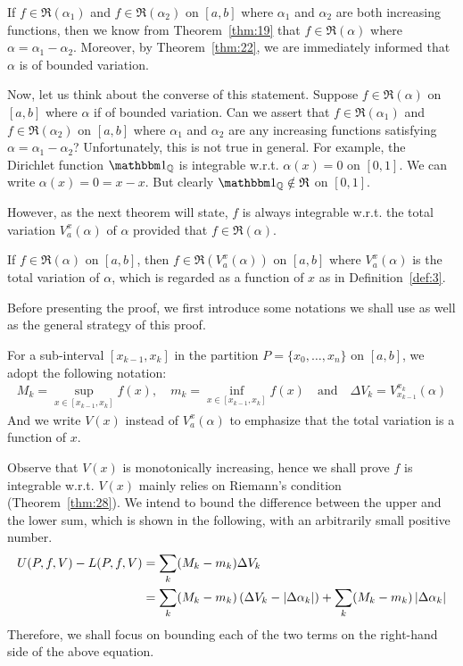 \documentclass[thmcnt=section, 12pt]{my-elegantbook}
\begin{document}
If $f \in \mathfrak{R}(\alpha_1)$ and $f \in \mathfrak{R}(\alpha_2)$ on $[a, b]$ where $\alpha_1$ and $\alpha_2$ are both increasing functions, then we know from Theorem~\ref{thm:19} that $f \in \mathfrak{R}(\alpha)$ where $\alpha = \alpha_1 - \alpha_2$. Moreover, by Theorem~\ref{thm:22}, we are immediately informed that $\alpha$ is of bounded variation. 

Now, let us think about the converse of this statement. Suppose $f \in \mathfrak{R}(\alpha)$ on $[a, b]$ where $\alpha$ if of bounded variation. Can we assert that $f \in \mathfrak{R}(\alpha_1)$ and $f \in \mathfrak{R}(\alpha_2)$ on $[a, b]$ where $\alpha_1$ and $\alpha_2$ are any increasing functions satisfying $\alpha = \alpha_1 - \alpha_2$? Unfortunately, this is not true in general. For example, the Dirichlet function $\ind_\Q$ is integrable w.r.t. $\alpha(x) = 0$ on $[0, 1]$. We can write $\alpha(x) = 0 = x - x$. But clearly $\ind_\Q \notin \mathfrak{R}$ on $[0, 1]$.

However, as the next theorem will state, $f$ is always integrable w.r.t. the total variation $V_a^x(\alpha)$ of $\alpha$ provided that $f \in \mathfrak{R}(\alpha)$.

\begin{theorem} \label{thm:37}
    If $f \in \mathfrak{R}(\alpha)$ on $[a, b]$, then $f \in \mathfrak{R}(V_a^x(\alpha))$ on $[a, b]$ where $V_a^x(\alpha)$ is the total variation of $\alpha$, which is regarded as a function of $x$ as in Definition~\ref{def:3}.
\end{theorem}

Before presenting the proof, we first introduce some notations we shall use as well as the general strategy of this proof.

For a sub-interval $[x_{k-1}, x_k]$ in the partition $P = \{ x_0, \ldots, x_n \}$ on $[a, b]$, we adopt the following notation:
\begin{align*}
    M_k = \sup_{x \in [x_{k-1}, x_k]} f(x),
    \quad
    m_k = \inf_{x \in [x_{k-1}, x_k]} f(x)
    \quad\text{and}\quad
    \Delta V_k = V_{x_{k-1}}^{x_k}(\alpha)
\end{align*}
And we write $V(x)$ instead of $V_a^x(\alpha)$ to emphasize that the total variation is a function of $x$.

Observe that $V(x)$ is monotonically increasing, hence we shall prove $f$ is integrable w.r.t. $V(x)$ mainly relies on Riemann's condition (Theorem~\ref{thm:28}). We intend to bound the difference between the upper and the lower sum, which is shown in the following, with an arbitrarily small positive number.
\begin{align*}
    U(P,f,V) - L(P,f,V)
    &= \sum_k (M_k - m_k) \Delta V_k \\ 
    &= \sum_k (M_k - m_k) \left( \Delta V_k - \left\lvert \Delta\alpha_k \right\rvert \right)
    + \sum_k (M_k - m_k) \left\lvert \Delta\alpha_k \right\rvert
\end{align*}
Therefore, we shall focus on bounding each of the two terms on the right-hand side of the above equation.
\end{document}
